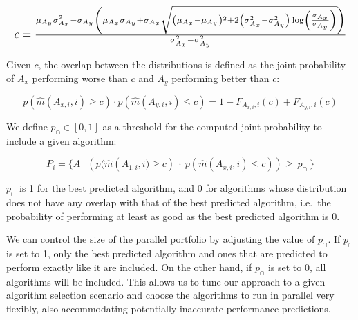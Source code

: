 \begin{equation}\label{eq:5}
\resizebox{\columnwidth}{!}{$c = \frac{\mu _{A_y} \sigma _{A_x}^2-\sigma _{A_y} \left(\mu _{A_x} \sigma _{A_y}+\sigma _{A_x} \sqrt{\left(\mu _{A_x}-\mu _{A_y}\right){}^2+2 \left(\sigma _{A_x}^2-\sigma _{A_y}^2\right) \log \left(\frac{\sigma _{A_x}}{\sigma _{A_y}}\right)}\right)}{\sigma _{A_x}^2-\sigma _{A_y}^2}$}
\end{equation}

Given $c$, the overlap between the distributions is defined as the joint probability of $A_x$ performing worse than $c$ and $A_y$ performing better than $c$:

\begin{equation}\label{eq:6}
    p(\hat{m}({A_{x,i}}, i) \geq c) \cdot p(\hat{m}({A_{y,i}}, i) \leq c) = 1 - F_{A_{x,i},i}(c) +  F_{A_{y,i},i}(c)
\end{equation}

We define $p_{\cap} \in [0,1]$ as a threshold for the computed joint probability to include a given algorithm:

\begin{equation}\label{eq:7}
 P_i = \{A \:| \: \left(p(\hat{m}({A_{1,i},i)} \geq c) \: \cdot \: p(\hat{m}({A_{x,i}}, i) \leq c)\right) \geq \:p_{\cap}\:\}
\end{equation}

$p_{\cap}$ is 1 for the best predicted algorithm, and 0 for algorithms whose distribution does not have any overlap with that of the best predicted algorithm, i.e.\ the probability of performing at least as good as the best predicted algorithm is 0.

We can control the size of the parallel portfolio by adjusting the value of $p_{\cap}$. If $p_{\cap}$ is set to 1, only the best predicted algorithm and ones that are predicted to perform exactly like it are included. On the other hand, if $p_{\cap}$ is set to 0, all algorithms will be included. This allows us to tune our approach to a given algorithm selection scenario and choose the algorithms to run in parallel very flexibly, also accommodating potentially inaccurate performance predictions.

